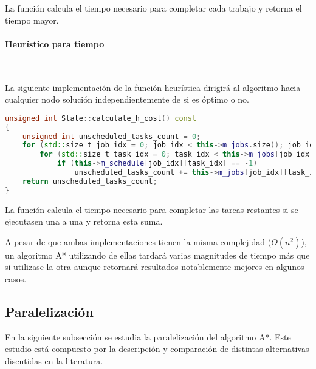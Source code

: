 La función calcula el tiempo necesario para completar cada trabajo
y retorna el tiempo mayor.

\pagebreak

\paragraph{Heurístico para tiempo}~

La siguiente implementación de la función heurística
dirigirá al algoritmo hacia cualquier nodo solución
independientemente de si es óptimo o no.

\begin{lstlisting}[language=C++]
unsigned int State::calculate_h_cost() const
{
    unsigned int unscheduled_tasks_count = 0;
    for (std::size_t job_idx = 0; job_idx < this->m_jobs.size(); job_idx++)
        for (std::size_t task_idx = 0; task_idx < this->m_jobs[job_idx].size(); task_idx++)
            if (this->m_schedule[job_idx][task_idx] == -1)
                unscheduled_tasks_count += this->m_jobs[job_idx][task_idx].get_duration();
    return unscheduled_tasks_count; 
}
\end{lstlisting}

La función calcula el tiempo necesario para completar
las tareas restantes si se ejecutasen una a una
y retorna esta suma.

\begin{notebox}
    A pesar de que ambas implementaciones tienen la misma complejidad ($O(n^2)$),
    un algoritmo A* utilizando de ellas tardará varias magnitudes de tiempo más que
    si utilizase la otra aunque retornará resultados notablemente mejores en algunos casos.
\end{notebox}

\pagebreak

\subsection{Paralelización}

En la siguiente subsección
se estudia la paralelización
del algoritmo A*.
Este estudio está compuesto por la descripción y
comparación de distintas alternativas discutidas en
la literatura.


